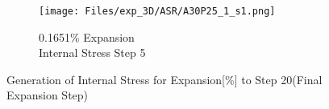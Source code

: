 
\begin{figure}[ht!]
\centering
    \begin{subfigure}{.25\textwidth}
      \centering
      \texttt{[image: Files/exp\_3D/ASR/A30P25\_1\_s1.png]}
      \caption{0.1651\% Expansion\\Internal Stress Step 5}
    \end{subfigure}%

\caption{Generation of Internal Stress for Expansion[\%] to Step 20(Final Expansion Step)}
\label{fig:A30P25_stress}
\end{figure}
